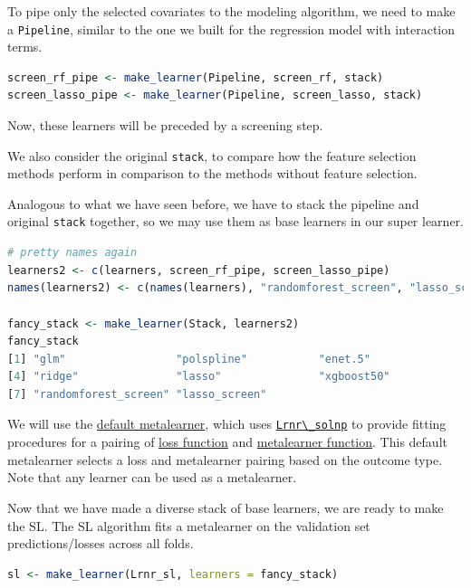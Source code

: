 \documentclass[
  12pt, krantz2,
]{krantz}
\newcommand{\passthrough}[1]{#1}
\theoremstyle{definition}
\theoremstyle{definition}
\theoremstyle{definition}
\newcommand{\1}{\mathbbm{1}}
\begin{document}
To pipe only the selected covariates to the modeling algorithm, we need to
make a \passthrough{\lstinline!Pipeline!}, similar to the one we built for the regression model with
interaction terms.

\begin{lstlisting}[language=R]
screen_rf_pipe <- make_learner(Pipeline, screen_rf, stack)
screen_lasso_pipe <- make_learner(Pipeline, screen_lasso, stack)
\end{lstlisting}

Now, these learners will be preceded by a screening step.

We also consider the original \passthrough{\lstinline!stack!}, to compare how the feature selection
methods perform in comparison to the methods without feature selection.

Analogous to what we have seen before, we have to stack the pipeline and
original \passthrough{\lstinline!stack!} together, so we may use them as base learners in our super
learner.

\begin{lstlisting}[language=R]
# pretty names again
learners2 <- c(learners, screen_rf_pipe, screen_lasso_pipe)
names(learners2) <- c(names(learners), "randomforest_screen", "lasso_screen")

fancy_stack <- make_learner(Stack, learners2)
fancy_stack
[1] "glm"                 "polspline"           "enet.5"             
[4] "ridge"               "lasso"               "xgboost50"          
[7] "randomforest_screen" "lasso_screen"       
\end{lstlisting}

We will use the \href{https://tlverse.org/sl3/reference/default_metalearner.html}{default
metalearner},
which uses
\href{https://tlverse.org/sl3/reference/Lrnr_solnp.html}{\passthrough{\lstinline!Lrnr\_solnp!}} to
provide fitting procedures for a pairing of \href{https://tlverse.org/sl3/reference/loss_functions.html}{loss
function} and
\href{https://tlverse.org/sl3/reference/metalearners.html}{metalearner
function}. This
default metalearner selects a loss and metalearner pairing based on the outcome
type. Note that any learner can be used as a metalearner.

Now that we have made a diverse stack of base learners, we are ready to make the
SL. The SL algorithm fits a metalearner on the validation set
predictions/losses across all folds.

\begin{lstlisting}[language=R]
sl <- make_learner(Lrnr_sl, learners = fancy_stack)
\end{lstlisting}
\end{document}
